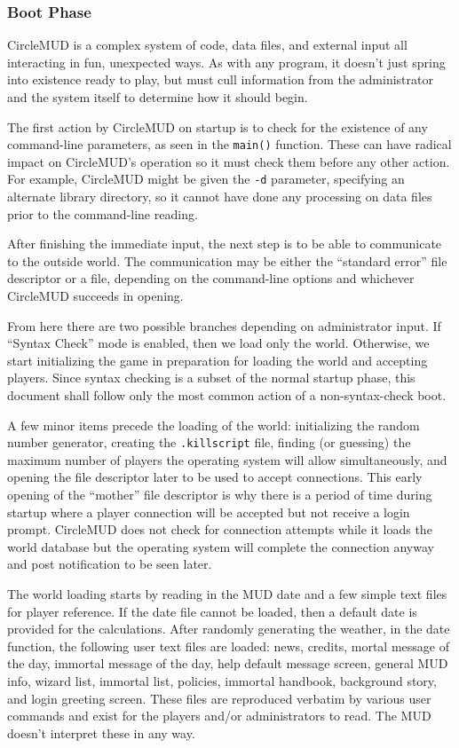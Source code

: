 \documentclass[11pt]{article}
\begin{document}
\subsubsection{Boot Phase}
CircleMUD is a complex system of code, data files, and external input all interacting in fun, unexpected ways.  As with any program, it doesn't just spring into existence ready to play, but must cull information from the administrator and the system itself to determine how it should begin.
\par
The first action by CircleMUD on startup is to check for the existence of any command-line parameters, as seen in the \texttt{main()} function. These can have radical impact on CircleMUD's operation so it must check them before any other action.  For example, CircleMUD might be given the \texttt{-d} parameter, specifying an alternate library directory, so it cannot have done any processing on data files prior to the command-line reading.
\par
After finishing the immediate input, the next step is to be able to communicate to the outside world.  The communication may be either the ``standard error'' file descriptor or a file, depending on the command-line options and whichever CircleMUD succeeds in opening.
\par
From here there are two possible branches depending on administrator input. If ``Syntax Check'' mode is enabled, then we load only the world. Otherwise, we start initializing the game in preparation for loading the world and accepting players.  Since syntax checking is a subset of the normal startup phase, this document shall follow only the most common action of a non-syntax-check boot.
\par
A few minor items precede the loading of the world: initializing the random number generator, creating the \texttt{.killscript} file, finding (or guessing) the maximum number of players the operating system will allow simultaneously, and opening the file descriptor later to be used to accept connections.  This early opening of the ``mother'' file descriptor is why there is a period of time during startup where a player connection will be accepted but not receive a login prompt.  CircleMUD does not check for connection attempts while it loads the world database but the operating system will complete the connection anyway and post notification to be seen later.
\par
The world loading starts by reading in the MUD date and a few simple text files for player reference.  If the date file cannot be loaded, then a default date is provided for the calculations.  After randomly generating the weather, in the date function, the following user text files are loaded: news, credits, mortal message of the day, immortal message of the day, help default message screen, general MUD info, wizard list, immortal list, policies, immortal handbook, background story, and login greeting screen.  These files are reproduced verbatim by various user commands and exist for the players and/or administrators to read.  The MUD doesn't interpret these in any way.
\end{document}
